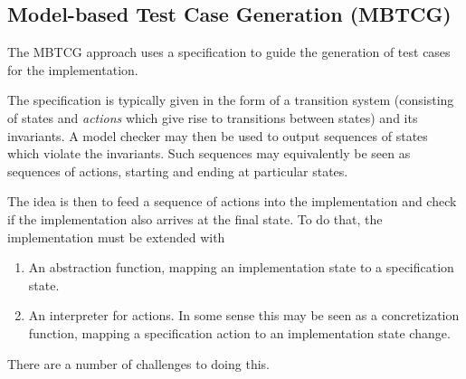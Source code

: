 \documentclass[a4paper]{article}
\begin{document}
\subsection{Model-based Test Case Generation (MBTCG)}
\label{sec: interpreter}

The MBTCG approach uses a specification to guide the generation of test cases for the implementation.

The specification is typically given in the form of a transition system (consisting of states and \emph{actions} which give rise to transitions between states) and its invariants.
%
A model checker may then be used to output sequences of states which violate the invariants.
%
Such sequences may equivalently be seen as sequences of actions, starting and ending at particular states.

The idea is then to feed a sequence of actions into the implementation and check if the implementation also arrives at the final state.
%
To do that, the implementation must be extended with

\begin{enumerate}
    \item An abstraction function, mapping an implementation state to a specification state.

    \item An interpreter for actions. In some sense this may be seen as a concretization function, mapping a specification action to an implementation state change.
\end{enumerate}

There are a number of challenges to doing this.
\end{document}
